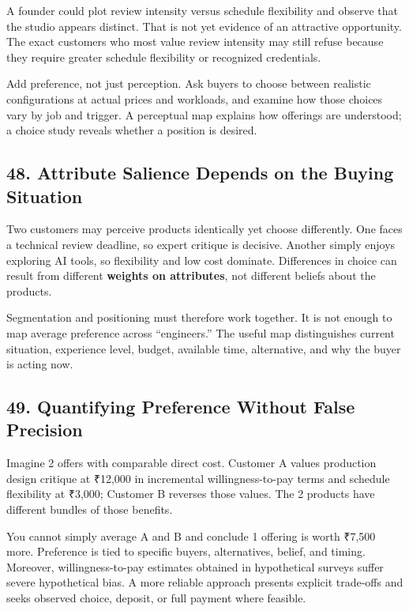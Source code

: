 A founder could plot review intensity versus schedule flexibility and observe that the studio appears distinct. That is not yet evidence of an attractive opportunity. The exact customers who most value review intensity may still refuse because they require greater schedule flexibility or recognized credentials.

Add preference, not just perception. Ask buyers to choose between realistic configurations at actual prices and workloads, and examine how those choices vary by job and trigger. A perceptual map explains how offerings are understood; a choice study reveals whether a position is desired.

\subsection*{48. Attribute Salience Depends on the Buying Situation}

Two customers may perceive products identically yet choose differently. One faces a technical review deadline, so expert critique is decisive. Another simply enjoys exploring AI tools, so flexibility and low cost dominate. Differences in choice can result from different \textbf{weights on attributes}, not different beliefs about the products.

Segmentation and positioning must therefore work together. It is not enough to map average preference across ``engineers.'' The useful map distinguishes current situation, experience level, budget, available time, alternative, and why the buyer is acting now.

\subsection*{49. Quantifying Preference Without False Precision}

Imagine 2 offers with comparable direct cost. Customer A values production design critique at ₹12,000 in incremental willingness-to-pay terms and schedule flexibility at ₹3,000; Customer B reverses those values. The 2 products have different bundles of those benefits.

You cannot simply average A and B and conclude 1 offering is worth ₹7,500 more. Preference is tied to specific buyers, alternatives, belief, and timing. Moreover, willingness-to-pay estimates obtained in hypothetical surveys suffer severe hypothetical bias. A more reliable approach presents explicit trade-offs and seeks observed choice, deposit, or full payment where feasible.

